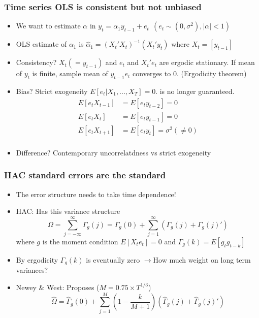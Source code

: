 \documentclass[aspectratio=169]{beamer}
\begin{document}
\begin{frame}
\frametitle{Time series OLS is consistent but not unbiased}
\begin{itemize}
\item We want to estimate $\alpha$ in $y_t= \alpha_1y_{t-1}+e_t\  \ (e_t \sim (0,\sigma^2), |\alpha|<1)$
\item OLS estimate of $\alpha_1$ is $\hat{\alpha}_1=(X_t'X_t)^{-1}(X_t'y_t)$ where $X_t = [y_{t-1}]$
\item Consistency?  $X_t (=y_{t-1})$ and $e_t$ and $X_t'e_t$ are ergodic stationary. If mean of $y_t$ is finite, sample mean of $y_{t-1}e_t$ converges to 0. (Ergodicity theorem)
\item Bias? Strict exogeneity $E[e_t|X_1,...,X_T]=0$. is no longer guaranteed.
\[
\begin{aligned}
E[e_tX_{t-1}]&=E[e_ty_{t-2}]=0\\
E[e_tX_t]&=E[e_ty_{t-1}]=0\\
E[e_tX_{t+1}]&=E[e_ty_t]=\sigma^2(\neq0)\\
\end{aligned}
\]
\item Difference? Contemporary uncorrelatdness vs strict exogeneity
\end{itemize}
\end{frame}

\begin{frame}
\frametitle{HAC standard errors are the standard}
\begin{itemize}
\item The error structure needs to take time dependence!
\item HAC: Has this variance structure
\[
\Omega=\sum_{j=-\infty}^\infty\Gamma_g(j)=\Gamma_g(0)+\sum_{j=1}^\infty\left(\Gamma_g(j)+\Gamma_g(j)'\right)
\]
where $g$ is the moment condition $E[X_te_t]=0$ and $\Gamma_g(k)=E[g_tg_{t-k}]$
\item By ergodicity $\Gamma_g(k)$ is eventually zero $\to$How much weight on long term variances?
\item Newey \& West: Proposes ($M=0.75\times T^{1/3}$)
\[
\widehat{\Omega}=\widehat{\Gamma}_g(0)+\sum_{j=1}^M \left(1-\frac{k}{M+1}\right)\left(\widehat{\Gamma}_g(j)+\widehat{\Gamma}_g(j)'\right)
\]
\end{itemize}
\end{frame}
\end{document}
